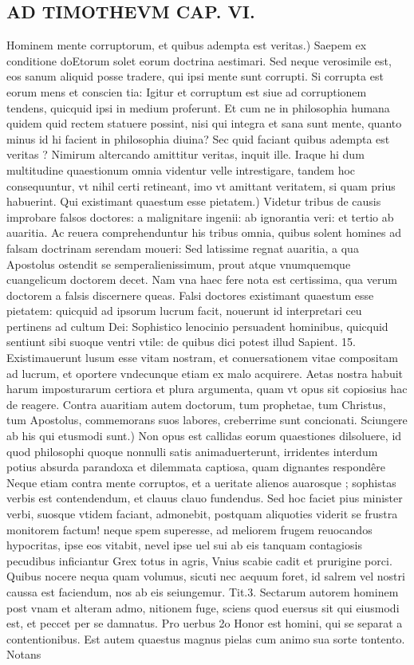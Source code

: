 \documentclass{article}
\begin{document}
\begin{pages}
\section*{AD TIMOTHEVM CAP. VI. }
\marginpar{[ p.124 ]}\pstart Hominem mente corruptorum, et quibus adempta est veritas.) Saepem ex conditione doEtorum solet eorum doctrina aestimari. Sed neque verosimile est, eos sanum aliquid posse tradere, qui ipsi mente sunt corrupti. Si corrupta est eorum mens et conscien tia: Igitur et corruptum est siue ad corruptionem tendens, quicquid ipsi in medium proferunt. Et cum ne in philosophia humana quidem quid rectem statuere possint, nisi qui integra et sana sunt mente, quanto minus id hi facient in philosophia diuina? Sec quid faciant quibus adempta est veritas ? Nimirum altercando amittitur veritas, inquit ille. Iraque hi dum multitudine quaestionum omnia videntur velle intrestigare, tandem hoc consequuntur, vt nihil certi retineant, imo vt amittant veritatem, si quam prius habuerint.  \pend\pstart Qui existimant quaestum esse pietatem.) Videtur tribus de causis improbare falsos doctores: a malignitare ingenii: ab ignorantia veri: et tertio ab auaritia. Ac reuera comprehenduntur his tribus omnia, quibus solent homines ad falsam doctrinam serendam moueri: Sed latissime regnat auaritia, a qua Apostolus ostendit se semperalienissimum, prout atque vnumquemque cuangelicum doctorem decet. Nam vna haec fere nota est certissima, qua verum doctorem a falsis discernere queas. Falsi doctores existimant quaestum esse pietatem: quicquid ad ipsorum lucrum facit, nouerunt id interpretari ceu pertinens ad cultum Dei: Sophistico lenocinio persuadent hominibus, quicquid sentiunt sibi suoque ventri vtile: de quibus dici potest illud Sapient. 15. Existimauerunt lusum esse vitam nostram, et conuersationem vitae compositam ad lucrum, et oportere vndecunque etiam ex malo acquirere. Aetas nostra habuit harum imposturarum certiora et plura argumenta, quam vt opus sit copiosius hac de reagere. Contra auaritiam autem doctorum, tum prophetae, tum Christus, tum Apostolus, commemorans suos labores, creberrime sunt concionati.  \pend\pstart Sciungere ab his qui etusmodi sunt.) Non opus est callidas eorum quaestiones dilsoluere, id quod philosophi quoque nonnulli satis animaduerterunt, irridentes interdum potius absurda parandoxa et dilemmata captiosa, quam dignantes respondêre Neque etiam contra mente corruptos, et a ueritate alienos auarosque ; sophistas verbis est contendendum, et clauus clauo fundendus. Sed hoc faciet pius minister verbi, suosque vtidem faciant, admonebit, postquam aliquoties viderit se frustra monitorem factum! neque spem superesse, ad meliorem frugem reuocandos hypocritas, ipse eos vitabit, nevel ipse uel sui ab eis tanquam contagiosis pecudibus inficiantur Grex totus in agris, Vnius scabie cadit et prurigine porci. Quibus nocere nequa quam volumus, sicuti nec aequum foret, id salrem vel nostri caussa est faciendum, nos ab eis seiungemur. Tit.3. Sectarum autorem hominem post vnam et alteram admo, nitionem fuge, sciens quod euersus sit qui eiusmodi est, et peccet per se damnatus. Pro uerbus 2o Honor est homini, qui se separat a contentionibus.  \pend\pstart Est autem quaestus magnus pielas cum animo sua sorte tontento. Notans 
\end{pages}
\end{document}

